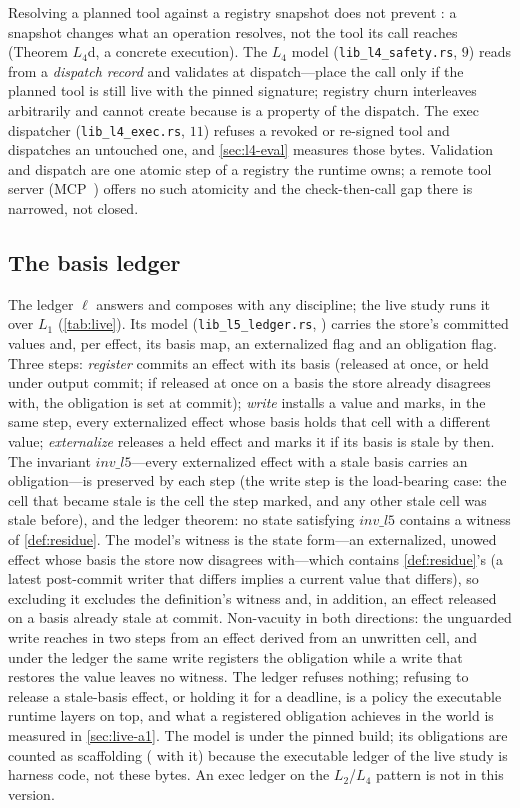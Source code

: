 Resolving a planned tool against a registry snapshot does not prevent : a
snapshot changes what an operation resolves, not the tool its call reaches
(Theorem $L_4$d, a concrete execution). The $L_4$ model
(\texttt{lib\_l4\_safety.rs}, $9$) reads  from a \emph{dispatch record}
and validates at dispatch---place the call only if the planned tool is still
live with the pinned signature; registry churn interleaves arbitrarily and
cannot create  because  is a property of the dispatch. The exec
dispatcher (\texttt{lib\_l4\_exec.rs}, $11$) refuses a revoked or re-signed
tool and dispatches an untouched one, and \cref{sec:l4-eval} measures those
bytes. Validation and dispatch are one atomic step of a registry the runtime
owns; a remote tool server (MCP~\cite{AnthropicMCP2024}) offers no such
atomicity and the check-then-call gap there is narrowed, not closed.


\subsection{The basis ledger}
\label{sec:ledger}
The ledger $\ell$ answers \Rp{} and composes with any discipline; the live
study runs it over $L_1$ (\cref{tab:live}). Its model
(\texttt{lib\_l5\_ledger.rs}, \LfiveVerus) carries the
store's committed values and, per effect, its basis map, an externalized
flag and an obligation flag. Three steps: \emph{register} commits an effect
with its basis (released at once, or held under output commit; if released
at once on a basis the store already disagrees with, the obligation is set
at commit); \emph{write} installs a value and marks, in the same step, every
externalized effect whose basis holds that cell with a different value;
\emph{externalize} releases a held effect and marks it if its basis is stale
by then. The invariant $\mathit{inv\_l5}$---every externalized effect with a
stale basis carries an obligation---is preserved by each step (the write
step is the load-bearing case: the cell that became stale is the cell the
step marked, and any other stale cell was stale before), and the ledger theorem:
no state satisfying $\mathit{inv\_l5}$ contains a witness of \cref{def:residue}.
The model's witness is the state form---an externalized, unowed effect whose
basis the store now disagrees with---which contains \cref{def:residue}'s (a
latest post-commit writer that differs implies a current value that
differs), so excluding it excludes the definition's witness and, in
addition, an effect released on a basis already stale at commit.
Non-vacuity in both directions: the unguarded write reaches \Rp{} in two
steps from an effect derived from an unwritten cell, and under the ledger the
same write registers the obligation while a write that restores the value
leaves no witness. The ledger refuses nothing; refusing to release a
stale-basis effect, or holding it for a deadline, is a policy the executable
runtime layers on top, and what a registered obligation achieves in the
world is measured in \cref{sec:live-a1}. The model is \LfiveVerusIntro{}
under the pinned build; its obligations are counted as scaffolding
(\VerusScaffold{} with it) because the executable ledger of the live study is
harness code, not these bytes. An exec ledger on the $L_2$/$L_4$ pattern is
not in this version.

